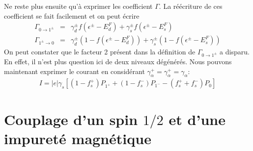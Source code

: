 Ne reste plus ensuite qu'à exprimer les coefficient $\Gamma$. La réécriture de ces coefficient se fait facilement et on peut écrire 
\begin{eqnarray}
\Gamma_{0 \rightarrow 1^\pm} &=&  \gamma_d^\pm f(\epsilon^\pm - E_d^F) + \gamma_s^\pm f(\epsilon^\pm - E_s^F)\\
\Gamma_{1^\pm \rightarrow 0} &=& \gamma_d^\pm (1- f(\epsilon^\pm - E_d^F)) + \gamma_s^\pm (1- f(\epsilon^\pm - E_s^F)) 
\end{eqnarray}
On peut constater que le facteur 2 présent dans la définition de $\Gamma_{0 \rightarrow 1^\pm}$ a disparu. En effet, il n'est plus question ici de deux niveaux dégénérés. Nous pouvons maintenant exprimer le courant en considérant $\gamma_{\alpha}^+ = \gamma_{\alpha}^+ = \gamma_{\alpha}$:
\begin{eqnarray}
I = |e| \gamma_s [(1 - f_s^+)P_{1^+} + (1-f_s^-)P_{1^-} - (f_s^+ + f_s^-)P_0]
\end{eqnarray}

\section{Couplage d'un spin $1/2$ et d'une impureté magnétique}
